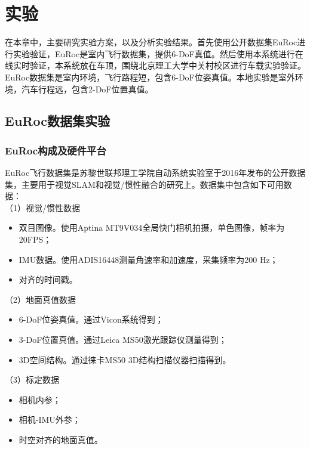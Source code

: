 \chapter{实验}
\label{chap:5}
在本章中，主要研究实验方案，以及分析实验结果。首先使用公开数据集EuRoc进行实验验证，EuRoc是室内飞行数据集，提供6-DoF真值。然后使用本系统进行在线实时验证，本系统放在车顶，围绕北京理工大学中关村校区进行车载实验验证。EuRoc数据集是室内环境，飞行路程短，包含6-DoF位姿真值。本地实验是室外环境，汽车行程远，包含2-DoF位置真值。
\section{EuRoc数据集实验}
\subsection{EuRoc构成及硬件平台}
EuRoc飞行数据集是苏黎世联邦理工学院自动系统实验室于2016年发布的公开数据集，主要用于视觉SLAM和视觉/惯性融合的研究上。数据集中包含如下可用数据：\\
（1）视觉/惯性数据
\vspace{-0.26cm}
\begin{itemize}
	\setlength{\itemsep}{-5pt}
	\item 双目图像。使用Aptina MT9V034全局快门相机拍摄，单色图像，帧率为20FPS；
	\item IMU数据。使用ADIS16448测量角速率和加速度，采集频率为200 Hz；
	\item 对齐的时间戳。
\end{itemize}
\vspace{-0.26cm}
（2）地面真值数据
\vspace{-0.26cm}
\begin{itemize}
	\setlength{\itemsep}{-5pt }
	\item 6-DoF位姿真值。通过Vicon系统得到；
	\item 3-DoF位置真值。通过Leica MS50激光跟踪仪测量得到；
	\item 3D空间结构。通过徕卡MS50 3D结构扫描仪器扫描得到。
\end{itemize}
\vspace{-0.26cm}
（3）标定数据
\vspace{-0.26cm}
\begin{itemize}
	\setlength{\itemsep}{-5pt }
	\item 相机内参；
	\item 相机-IMU外参；
	\item 时空对齐的地面真值。
\end{itemize}
\vspace{-0.26cm}

